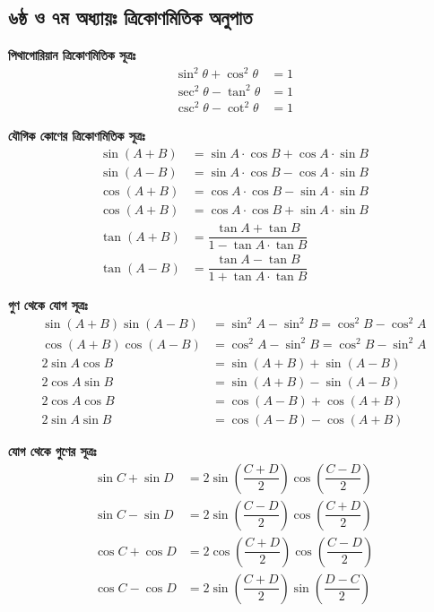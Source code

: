 \documentclass[a4paper,12pt]{article}
\newcommand{\lt}{\left}
\newcommand{\rt}{\right}
\begin{document}
\subsection{৬ষ্ঠ ও ৭ম অধ্যায়ঃ ত্রিকোণমিতিক অনুপাত}
\textbf{পিথাগোরিয়ান ত্রিকোণমিতিক সূত্রঃ}
\begin{align*}
    \sin^2 \theta + \cos ^2 \theta &= 1\\
    \sec^2 \theta - \tan ^2 \theta &= 1\\
    \csc^2 \theta - \cot^2 \theta &= 1
\end{align*}

\textbf{যৌগিক কোণের ত্রিকোণমিতিক সূত্রঃ} 
\begin{align*}
    \sin (A+B) &= \sin A \cdot \cos B + \cos A \cdot \sin B \\ 
    \sin (A-B) &= \sin A \cdot \cos B - \cos A \cdot \sin B \\
    \cos (A+B) &= \cos A \cdot \cos B - \sin A \cdot \sin B \\
    \cos (A+B) &= \cos A \cdot \cos B + \sin A \cdot \sin B \\
    \tan (A+B) &= \dfrac{\tan A + \tan B}{1-\tan A \cdot \tan B}\\
    \tan (A-B) &= \dfrac{\tan A - \tan B}{1+\tan A \cdot \tan B}
\end{align*} 

\textbf{গুণ থেকে যোগ সূত্রঃ} \label{1}
\begin{align*}
    \sin (A+B)\sin(A-B) &= \sin^2 A -\sin^2 B = \cos^2 B- \cos^2 A\\
    \cos (A+B)\cos(A-B) &= \cos^2 A -\sin^2 B = \cos^2 B- \sin^2 A\\
    2\sin A \cos B &= \sin (A+B) + \sin (A-B)\\
    2\cos A \sin B &= \sin (A+B) - \sin (A-B)\\
    2\cos A \cos B &= \cos (A-B) + \cos (A+B)\\
    2\sin A \sin B &= \cos (A-B) - \cos (A+B)
\end{align*} 

\textbf{যোগ থেকে গুণের সূত্রঃ}
\begin{align*}
    \sin C + \sin D &= 2\sin \lt(\dfrac{C+D}{2} \rt) \cos \lt( \dfrac{C-D}{2}\rt)\\
    \sin C - \sin D &= 2\sin \lt(\dfrac{C-D}{2} \rt) \cos \lt( \dfrac{C+D}{2}\rt)\\
    \cos C + \cos D &= 2\cos \lt(\dfrac{C+D}{2} \rt) \cos \lt( \dfrac{C-D}{2}\rt)\\
    \cos C - \cos D &= 2\sin \lt(\dfrac{C+D}{2} \rt) \sin \lt( \dfrac{D-C}{2}\rt)
\end{align*} 
\end{document}
